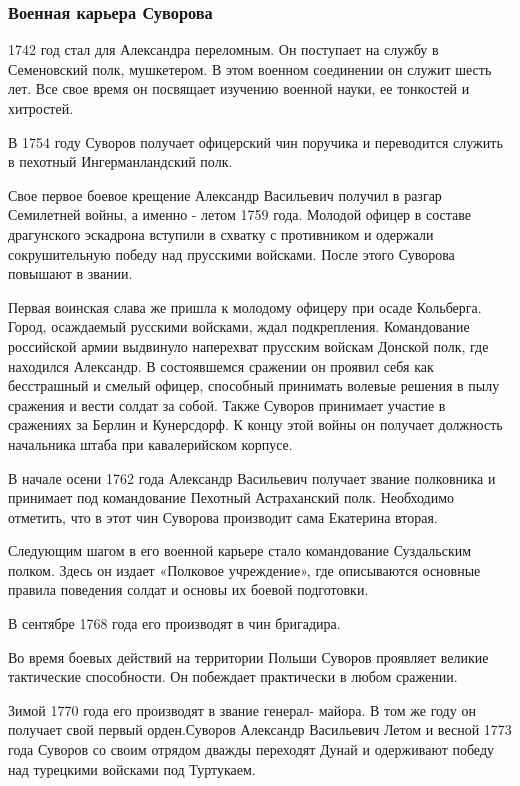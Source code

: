 \subsubsection{Военная карьера Суворова}

1742 год стал для Александра переломным. Он поступает на службу в Семеновский
полк, мушкетером. В этом военном соединении он служит шесть лет. Все свое время
он посвящает изучению военной науки, ее тонкостей и хитростей.

В 1754 году Суворов получает офицерский чин поручика и переводится служить в
пехотный Ингерманландский полк.

Свое первое боевое крещение Александр Васильевич получил в разгар Семилетней
войны, а именно - летом 1759 года. Молодой офицер в составе драгунского
эскадрона вступили в схватку с противником и одержали сокрушительную победу над
прусскими войсками. После этого Суворова повышают в звании.

Первая воинская слава же пришла к молодому офицеру при осаде Кольберга. Город,
осаждаемый русскими войсками, ждал подкрепления. Командование российской армии
выдвинуло наперехват прусским войскам Донской полк, где находился Александр. В
состоявшемся сражении он проявил себя как бесстрашный и смелый офицер,
способный принимать волевые решения в пылу сражения и вести солдат за собой.
Также Суворов принимает участие в сражениях за Берлин и Кунерсдорф. К концу
этой войны он получает должность начальника штаба при кавалерийском корпусе.

В начале осени 1762 года Александр Васильевич получает звание полковника и
принимает под командование Пехотный Астраханский полк. Необходимо отметить, что
в этот чин Суворова производит сама Екатерина вторая.

Следующим шагом в его военной карьере стало командование Суздальским полком.
Здесь он издает «Полковое учреждение», где описываются основные правила
поведения солдат и основы их боевой подготовки.

В сентябре 1768 года его производят в чин бригадира.

Во время боевых действий на территории Польши Суворов проявляет великие
тактические способности. Он побеждает практически в любом сражении.

Зимой 1770 года его производят в звание генерал- майора. В том же году он получает свой первый орден.Суворов Александр Васильевич
Летом и весной 1773 года Суворов со своим отрядом дважды переходят Дунай и
одерживают победу над турецкими войсками под Туртукаем.


